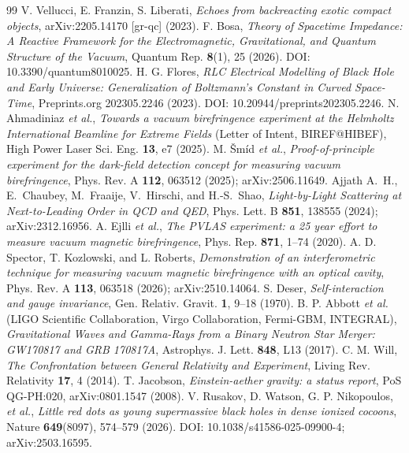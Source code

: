 \documentclass[11pt,a4paper]{article}
\theoremstyle{plain}
\theoremstyle{remark}
\begin{document}
\begin{thebibliography}{99}
 V. Vellucci, E. Franzin, S. Liberati, \textit{Echoes from backreacting exotic compact objects}, arXiv:2205.14170 [gr-qc] (2023).
 F. Bosa, \textit{Theory of Spacetime Impedance: A Reactive Framework for the Electromagnetic, Gravitational, and Quantum Structure of the Vacuum}, Quantum Rep. \textbf{8}(1), 25 (2026). DOI: 10.3390/quantum8010025.
 H. G. Flores, \textit{RLC Electrical Modelling of Black Hole and Early Universe: Generalization of Boltzmann's Constant in Curved Space-Time}, Preprints.org 202305.2246 (2023). DOI: 10.20944/preprints202305.2246.
 N. Ahmadiniaz \emph{et al.}, \emph{Towards a vacuum birefringence experiment at the Helmholtz International Beamline for Extreme Fields} (Letter of Intent, BIREF@HIBEF), High Power Laser Sci. Eng. \textbf{13}, e7 (2025).
 M. \v{S}m\'{i}d \emph{et al.}, \emph{Proof-of-principle experiment for the dark-field detection concept for measuring vacuum birefringence}, Phys. Rev. A \textbf{112}, 063512 (2025); arXiv:2506.11649.
 Ajjath A.~H., E.~Chaubey, M.~Fraaije, V.~Hirschi, and H.-S.~Shao, \emph{Light-by-Light Scattering at Next-to-Leading Order in QCD and QED}, Phys. Lett. B \textbf{851}, 138555 (2024); arXiv:2312.16956.
 A. Ejlli \emph{et al.}, \emph{The PVLAS experiment: a 25 year effort to measure vacuum magnetic birefringence}, Phys. Rep. \textbf{871}, 1--74 (2020).
 A. D. Spector, T. Kozlowski, and L. Roberts, \emph{Demonstration of an interferometric technique for measuring vacuum magnetic birefringence with an optical cavity}, Phys. Rev. A \textbf{113}, 063518 (2026); arXiv:2510.14064.
 S. Deser, \emph{Self-interaction and gauge invariance}, Gen. Relativ. Gravit. \textbf{1}, 9--18 (1970).
 B. P. Abbott \emph{et al.} (LIGO Scientific Collaboration, Virgo Collaboration, Fermi-GBM, INTEGRAL), \emph{Gravitational Waves and Gamma-Rays from a Binary Neutron Star Merger: GW170817 and GRB 170817A}, Astrophys. J. Lett. \textbf{848}, L13 (2017).
 C. M. Will, \emph{The Confrontation between General Relativity and Experiment}, Living Rev. Relativity \textbf{17}, 4 (2014).
 T. Jacobson, \emph{Einstein-aether gravity: a status report}, PoS QG-PH:020, arXiv:0801.1547 (2008).
 V. Rusakov, D. Watson, G. P. Nikopoulos, \emph{et al.}, \emph{Little red dots as young supermassive black holes in dense ionized cocoons}, Nature \textbf{649}(8097), 574--579 (2026). DOI: 10.1038/s41586-025-09900-4; arXiv:2503.16595.

\end{thebibliography}
\end{document}
